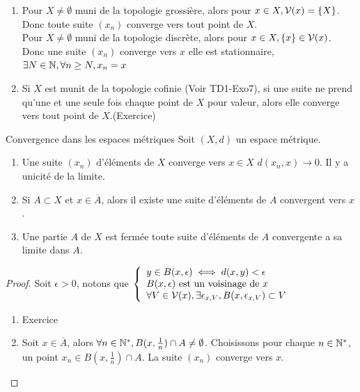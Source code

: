 \documentclass[]{report}
\begin{document}
    \begin{ex}{}{}
        \begin{enumerate}
            \item Pour $X\neq\emptyset$ muni de la topologie grossière, alors pour $x\in X,\mathcal{V}(x)=\{X\}$. Donc toute suite $(x_n)$ converge vers tout point de $X$.\\
            Pour $X\neq \emptyset$ muni de la topologie discrète, alors pour $x\in X,\{x\}\in\mathcal{V}(x)$. Donc une suite $(x_n)$ converge vers $x$ \ssi elle est stationnaire, $\exists N\in\mathbb{N},\forall n\ge N,x_n=x$
            \item Si $X$ est munit de la topologie cofinie (Voir TD1-Exo7), si une suite ne prend qu'une et une seule fois chaque point de $X$ pour valeur, alors elle converge vers tout point de $X$.(Exercice)
        \end{enumerate}
    \end{ex}

    \begin{tm}{Convergence dans les espaces métriques}{}
        Soit $(X,d)$ un espace métrique.
        \begin{enumerate}
            \item Une suite $(x_n)$ d'éléments de $X$ converge vers $x\in X$ \ssi $d(x_n,x)\to 0$. Il y a unicité de la limite.
            \item Si $A\subset X$ et $x\in \overline{A}$, alors il existe une suite d'éléments de $A$ convergent vers $x$.
            \item Une partie $A$ de $X$ est fermée \ssi toute suite d'éléments de $A$ convergente a sa limite dans $A$.
        \end{enumerate}
    \end{tm}

    \begin{proof}{}{}
        Soit $\epsilon>0$, notons que $\left\{\begin{array}{ll} y\in B(x,\epsilon)\iff d(x,y)<\epsilon\\ B(x,\epsilon)\text{ est un voisinage de $x$}\\ \forall V\in\mathcal{V}(x),\exists\epsilon_{x,V},B(x,\epsilon_{x,V})\subset V \end{array} \right.$
        \begin{enumerate}
            \item Exercice
            \item Soit $x\in \overline{A}$, alors $\forall n\in \mathbb{N}^*,B(x,\frac{1}{n})\cap A\neq \emptyset$. Choisissons pour chaque $n\in\mathbb{N}^*$, un point $x_n\in B(x,\frac{1}{n})\cap A$. La suite $(x_n)$ converge vers $x$.
        \end{enumerate}
    \end{proof}
\end{document}
